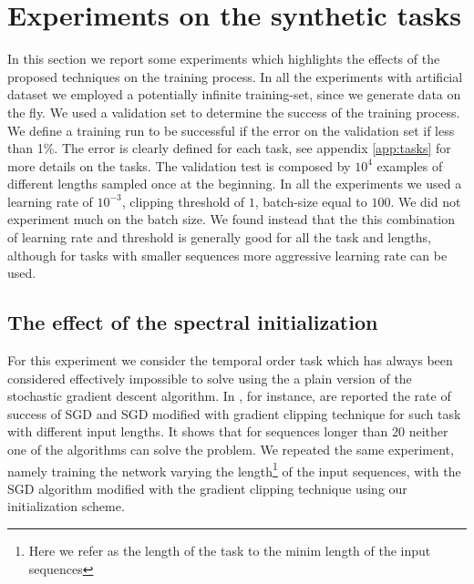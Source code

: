 \section{Experiments on the synthetic tasks}
In this section we report some experiments which highlights the effects of the proposed techniques on the training process. In all the experiments with artificial dataset we employed a potentially infinite training-set, since we generate data on the fly. We used a validation set to determine the success of the training process. We define a training run to be successful if the error on the validation set if less than 1\%. The error is clearly defined for each task, see appendix \ref{app:tasks} for more details on the tasks. The validation test is composed by $10^4$ examples of different lengths sampled once at the beginning. In all the experiments we used a learning rate of $10^{-3}$, clipping threshold of $1$, batch-size equal to $100$. We did not experiment much on the batch size. We found instead that the this combination of learning rate and threshold is generally good for all the task and lengths, although for tasks with smaller sequences more aggressive learning rate can be used.

\subsection{The effect of the spectral initialization}

For this experiment we consider the temporal order task which has always been considered effectively impossible to solve using the a plain version of the stochastic  gradient descent algorithm.
In \cite{advancesInOptimizingRnns}, for instance, are reported the rate of success of SGD and SGD modified with gradient clipping technique for such task with different input lengths. It shows that for sequences longer than 20 neither one of the algorithms can solve the problem. We repeated the same experiment, namely training the network varying the length\footnote{Here we refer as the length of the task to the minim length of the input sequences} of the input sequences, with the SGD algorithm modified with the gradient clipping technique using our initialization scheme. 


